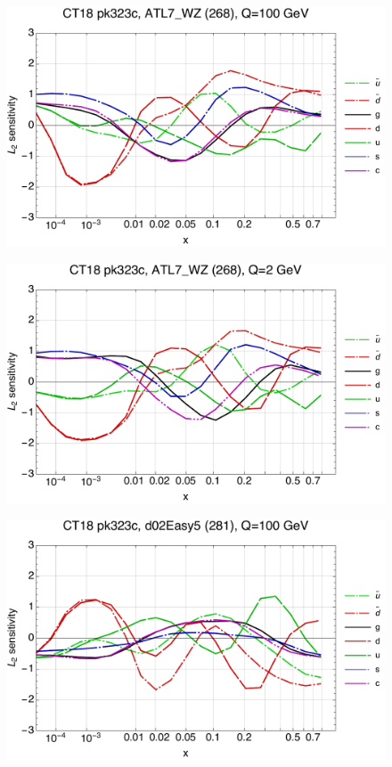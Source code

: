\documentclass[10pt,aps,prd,floatfix,titlepage]{revtex4}
\begin{document}
\clearpage
\begin{figure}
\includegraphics[width=\textwidth,height=0.44\textheight,keepaspectratio]{1/268_ct18nn_L2_q100_Sf_1.pdf}
\caption{}
\end{figure}
\begin{figure}
\includegraphics[width=\textwidth,height=0.44\textheight,keepaspectratio]{1/268_ct18nn_L2_q2_Sf_1.pdf}
\caption{}
\end{figure}
\clearpage
\begin{figure}
\includegraphics[width=\textwidth,height=0.44\textheight,keepaspectratio]{1/281_ct18nn_L2_q100_Sf_1.pdf}
\caption{}
\end{figure}
\end{document}
